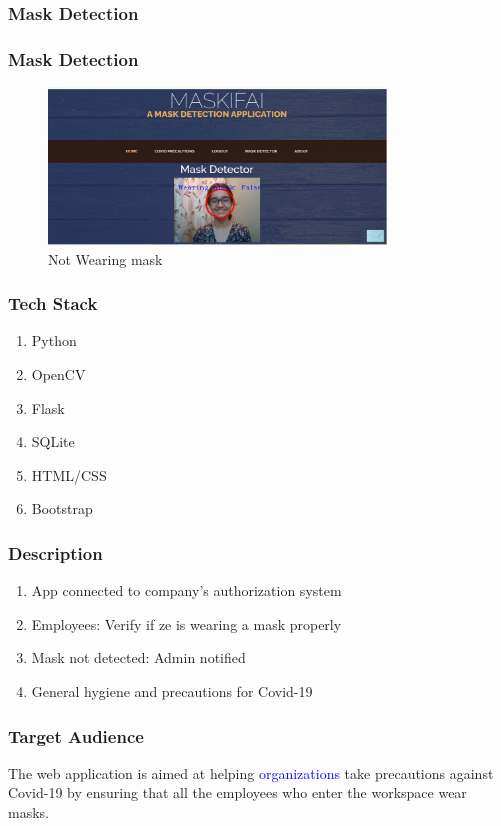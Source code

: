 \documentclass[14pt]{beamer}
\begin{document}
\begin{frame}
    \frametitle{Mask Detection}
    \frametitle{Mask Detection}
    \begin{figure}
    \caption{Not Wearing mask}
    \centering
    \includegraphics[width=0.8\textwidth]{no_mask}
    \end{figure}
\end{frame}

\begin{frame}
    \frametitle{Tech Stack}
    \begin{enumerate}
        \item Python
        \item OpenCV
        \item Flask
        \item SQLite
        \item HTML/CSS
        \item Bootstrap
    \end{enumerate}
\end{frame} 

\begin{frame}
    \frametitle{Description}
    \begin{enumerate}
        \item App connected to company's authorization system

        \item Employees: Verify if ze is wearing a mask properly

        \item Mask not detected: Admin notified

        \item General hygiene and precautions for Covid-19
    \end{enumerate}
\end{frame}


\begin{frame}
    \frametitle{Target Audience}
    The web application is aimed at helping \textcolor{blue}{organizations} take precautions against Covid-19 by ensuring that all the employees who enter the workspace wear masks.
\end{frame}
\end{document}
